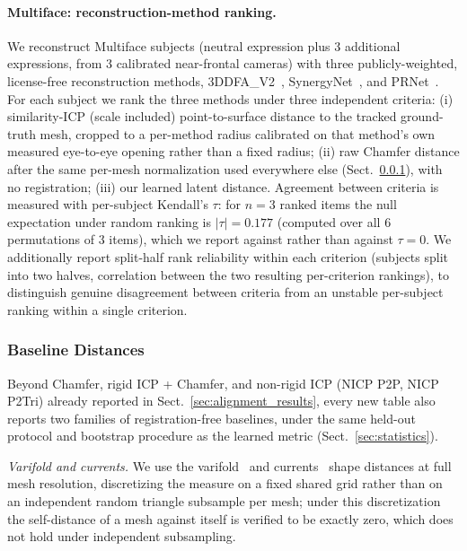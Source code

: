 \paragraph{Multiface: reconstruction-method ranking.}
We reconstruct Multiface subjects (neutral expression plus 3 additional expressions, from 3 calibrated near-frontal cameras) with three publicly-weighted, license-free reconstruction methods, 3DDFA\_V2~\cite{3ddfav2}, SynergyNet~\cite{synergynet}, and PRNet~\cite{prnet}. For each subject we rank the three methods under three independent criteria: (i) similarity-ICP (scale included) point-to-surface distance to the tracked ground-truth mesh, cropped to a per-method radius calibrated on that method's own measured eye-to-eye opening rather than a fixed radius; (ii) raw Chamfer distance after the same per-mesh normalization used everywhere else (Sect.~\ref{sec:baseline_protocol}), with no registration; (iii) our learned latent distance. Agreement between criteria is measured with per-subject Kendall's $\tau$: for $n=3$ ranked items the null expectation under random ranking is $|\tau|=0.177$ (computed over all 6 permutations of 3 items), which we report against rather than against $\tau=0$. We additionally report split-half rank reliability within each criterion (subjects split into two halves, correlation between the two resulting per-criterion rankings), to distinguish genuine disagreement between criteria from an unstable per-subject ranking within a single criterion.

\subsubsection{Baseline Distances}
\label{sec:baseline_protocol}
Beyond Chamfer, rigid ICP + Chamfer, and non-rigid ICP (NICP P2P, NICP P2Tri) already reported in Sect.~\ref{sec:alignment_results}, every new table also reports two families of registration-free baselines, under the same held-out protocol and bootstrap procedure as the learned metric (Sect.~\ref{sec:statistics}).

\emph{Varifold and currents.} We use the varifold~\cite{kaltenmark2017general} and currents~\cite{vaillant2005surface} shape distances at full mesh resolution, discretizing the measure on a fixed shared grid rather than on an independent random triangle subsample per mesh; under this discretization the self-distance of a mesh against itself is verified to be exactly zero, which does not hold under independent subsampling.


